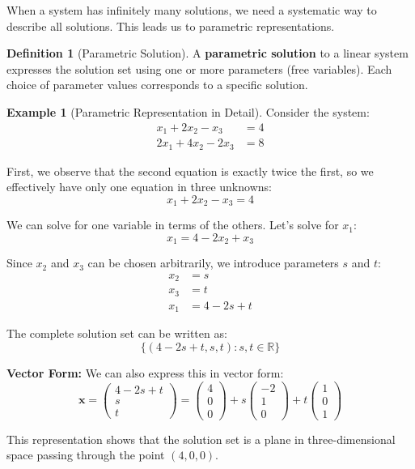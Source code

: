 \documentclass[12pt]{article}
\numberwithin{equation}{section}
\newcommand{\RR}{\mathbb{R}}
\newcommand{\vect}[1]{\boldsymbol{#1}}   %
\theoremstyle{plain}
\theoremstyle{definition}
\newtheorem{definition}[theorem]{Definition}
\newtheorem{example}[theorem]{Example}
\theoremstyle{remark}
\begin{document}
When a system has infinitely many solutions, we need a systematic way to describe all solutions. This leads us to parametric representations.

\begin{definition}[Parametric Solution]
A \textbf{parametric solution} to a linear system expresses the solution set using one or more parameters (free variables). Each choice of parameter values corresponds to a specific solution.
\end{definition}

\begin{example}[Parametric Representation in Detail]
Consider the system:
\begin{align}
x_1 + 2x_2 - x_3 &= 4\\
2x_1 + 4x_2 - 2x_3 &= 8
\end{align}

First, we observe that the second equation is exactly twice the first, so we effectively have only one equation in three unknowns:
$$x_1 + 2x_2 - x_3 = 4$$

We can solve for one variable in terms of the others. Let's solve for $x_1$:
$$x_1 = 4 - 2x_2 + x_3$$

Since $x_2$ and $x_3$ can be chosen arbitrarily, we introduce parameters $s$ and $t$:
\begin{align}
x_2 &= s\\
x_3 &= t\\
x_1 &= 4 - 2s + t
\end{align}

The complete solution set can be written as:
$$\{(4 - 2s + t, s, t) : s, t \in \RR\}$$

\textbf{Vector Form:} We can also express this in vector form:
$$\vect{x} = \begin{pmatrix} 4 - 2s + t \\ s \\ t \end{pmatrix} = \begin{pmatrix} 4 \\ 0 \\ 0 \end{pmatrix} + s\begin{pmatrix} -2 \\ 1 \\ 0 \end{pmatrix} + t\begin{pmatrix} 1 \\ 0 \\ 1 \end{pmatrix}$$

This representation shows that the solution set is a plane in three-dimensional space passing through the point $(4, 0, 0)$.
\end{example}
\end{document}
